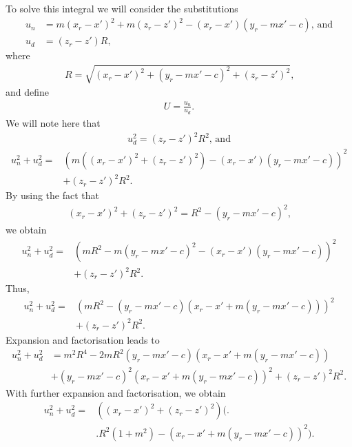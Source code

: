 To solve this integral we will consider the substitutions
\begin{align}
    u_n &= m\left(x_r-x'\right)^2+m\left(z_r-z'\right)^2-\left(x_r-x'\right)\left(y_r-mx'-c\right) \text{, and} \nonumber \\
    u_d &= \left(z_r-z'\right)R \text{,}
\end{align}
where
\begin{align}
    R = \sqrt{\left(x_r-x'\right)^2+\left(y_r-mx'-c\right)^2+\left(z_r-z'\right)^2} \text{,}
\end{align}
and define
\begin{align}
    U = \frac{u_n}{u_d} \text{.}
\end{align}
We will note here that
\begin{align}\label{eqn:udsq}
    u_d^2 = \left(z_r-z'\right)^2R^2 \text{, and}
\end{align}
\begin{align}
    u_n^2+u_d^2 = &\left(m\left(\left(x_r-x'\right)^2+\left(z_r-z'\right)^2\right)-\left(x_r-x'\right)\left(y_r-mx'-c\right)\right)^2 \nonumber \\
    &+\left(z_r-z'\right)^2R^2 \text{.}
\end{align}
By using the fact that
\begin{align}
    \left(x_r-x'\right)^2+\left(z_r-z'\right)^2 = R^2 - \left(y_r-mx'-c\right)^2 \text{,}
\end{align}
we obtain
\begin{align}
    u_n^2+u_d^2 = &\left(mR^2 - m\left(y_r-mx'-c\right)^2 - \left(x_r-x'\right)\left(y_r-mx'-c\right)\right)^2 \nonumber \\
    &+\left(z_r-z'\right)^2R^2 \text{.} \nonumber
\end{align}
Thus,
\begin{align}
    u_n^2+u_d^2 = &\left(mR^2 - \left(y_r-mx'-c\right)\left(x_r-x'+m\left(y_r-mx'-c\right)\right)\right)^2 \nonumber \\
    &+\left(z_r-z'\right)^2R^2 \text{.} \nonumber
\end{align}
Expansion and factorisation leads to
\begin{align}
    u_n^2+u_d^2 &= m^2R^4 - 2mR^2\left(y_r-mx'-c\right)\left(x_r-x'+m\left(y_r-mx'-c\right)\right) \nonumber \\
    & + \left(y_r-mx'-c\right)^2\left(x_r-x'+m\left(y_r-mx'-c\right)\right)^2 + \left(z_r-z'\right)^2R^2 \text{.}
\end{align}
With further expansion and factorisation, we obtain
\begin{align}
    u_n^2+u_d^2 = &\left(\left(x_r-x'\right)^2+\left(z_r-z'\right)^2\right)\Bigg( \Bigg. \nonumber \\
    &\Bigg. R^2\left(1+m^2\right)-\left(x_r-x'+m\left(y_r-mx'-c\right)\right)^2\Bigg) \text{.}
\end{align}
